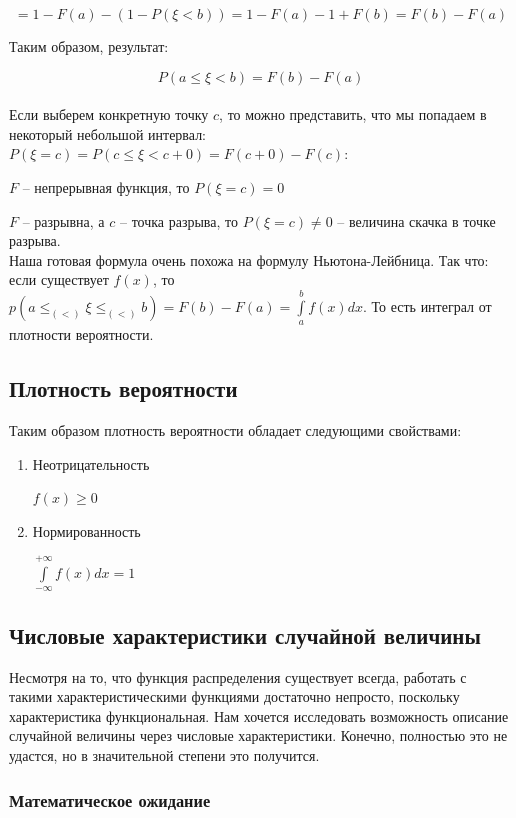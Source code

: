 \documentclass{article}
\begin{document}
$$ = 1 - F(a) - (1 - P(\xi < b)) = 1 - F(a) - 1 + F(b) = F(b) - F(a)$$

Таким образом, результат:

$$ P(a \leq \xi < b) = F(b) - F(a)$$
\\


Если выберем конкретную точку $c$, то можно представить, что мы попадаем в некоторый небольшой интервал: $P(\xi = c) = P(c \leq \xi < c + 0) = F(c + 0) - F(c)$:

 $F$ -- непрерывная функция, то $P(\xi = c) = 0$

 $F$ -- разрывна, а $c$ -- точка разрыва, то $P(\xi = c) \not= 0$ -- величина скачка в точке разрыва.
\\

Наша готовая формула очень похожа на формулу Ньютона-Лейбница. Так что:
если существует $f(x)$, то $p(a \leq_{(<)} \xi \leq_{(<)} b) = F(b) - F(a) = \int\limits_a^b f(x)dx$. То есть интеграл от плотности вероятности.

\subsection{Плотность вероятности}

Таким образом плотность вероятности обладает следующими свойствами:

\begin{enumerate}
\item Неотрицательность

\qquad$ f(x) \geq 0$

\item Нормированность

\qquad$ \int\limits_{-\infty}^{+\infty}f(x)dx = 1$

\end{enumerate}

\subsection{Числовые характеристики случайной величины}

Несмотря на то, что функция распределения существует всегда, работать с такими характеристическими функциями достаточно непросто, поскольку характеристика функциональная. Нам хочется исследовать возможность описание случайной величины через числовые характеристики. Конечно, полностью это не удастся, но в значительной степени это получится.

\subsubsection{Математическое ожидание}
\end{document}
